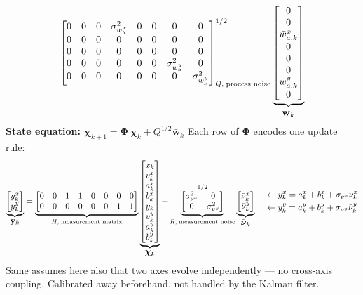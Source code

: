 \documentclass[12pt, a4paper]{article}
\begin{document}
\[{\begin{bmatrix}
  0 & 0 & 0              & \sigma_{w_b^x}^2 & 0 & 0 & 0            & 0             \\
  0 & 0 & 0              & 0              & 0 & 0 & 0              & 0             \\
  0 & 0 & 0              & 0              & 0 & 0 & 0              & 0             \\
  0 & 0 & 0              & 0              & 0 & 0 & \sigma_{w_a^y}^2 & 0           \\
  0 & 0 & 0              & 0              & 0 & 0 & 0              & \sigma_{w_b^y}^2
\end{bmatrix}
}_{Q,\;{\scriptsize\text{process noise}}}^{1/2}
\underbrace{
\begin{bmatrix} 0 \\ 0 \\ \bar{w}^x_{a,k} \\ 0 \\ 0 \\ 0 \\ \bar{w}^y_{a,k} \\ 0 \end{bmatrix}
}_{\displaystyle\bar{\mathbf{w}}_k}
\]
\textbf{State equation:}
$\boldsymbol{\chi}_{k+1} = \boldsymbol{\Phi}\,\boldsymbol{\chi}_k + Q^{1/2}\bar{\mathbf{w}}_k$
Each row of $\boldsymbol{\Phi}$ encodes one update rule:
\[
\underbrace{
\begin{bmatrix} y^x_k \\ y^y_k \end{bmatrix}
}_{\displaystyle\mathbf{y}_k}
=
\underbrace{
\begin{bmatrix}
  0 & 0 & 1 & 1 & 0 & 0 & 0 & 0 \\
  0 & 0 & 0 & 0 & 0 & 0 & 1 & 1
\end{bmatrix}
}_{H,\;{\scriptsize\text{measurement matrix}}}
\underbrace{
\begin{bmatrix} x_k \\ v^x_k \\ a^x_k \\ b^x_k \\ y_k \\ v^y_k \\ a^y_k \\ b^y_k \end{bmatrix}
}_{\displaystyle\boldsymbol{\chi}_k}
+
\underbrace{
\begin{bmatrix} \sigma_{\nu^x}^2 & 0 \\ 0 & \sigma_{\nu^y}^2 \end{bmatrix}
}_{R,\;{\scriptsize\text{measurement noise}}}^{1/2}
\underbrace{
\begin{bmatrix} \bar{\nu}^x_k \\ \bar{\nu}^y_k \end{bmatrix}
}_{\displaystyle\bar{\boldsymbol{\nu}}_k}
\quad
\begin{aligned}
  &\leftarrow y^x_k = a^x_k + b^x_k + \sigma_{\nu^x}\bar{\nu}^x_k\\
  &\leftarrow y^y_k = a^y_k + b^y_k + \sigma_{\nu^y}\bar{\nu}^y_k
\end{aligned}
\]
Same assumes here also that two axes evolve independently ---
no cross-axis coupling. Calibrated away beforehand, not handled by the Kalman filter.
\end{document}
